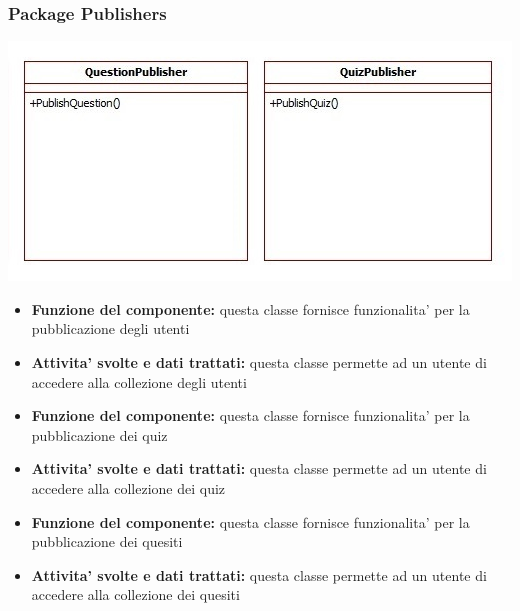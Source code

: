 			\subsubsection{Package Publishers}
			\begin{center}
				\includegraphics[scale=0.6]{../images/Publishers.jpg}
			\end{center}
			\begin{itemize}
				\item\textbf{Funzione del componente:} questa classe fornisce funzionalita' per la pubblicazione degli utenti
				\item\textbf{Attivita' svolte e dati trattati:} questa classe permette ad un utente di accedere alla collezione degli utenti
			\end{itemize}
			\begin{itemize}
				\item\textbf{Funzione del componente:} questa classe fornisce funzionalita' per la pubblicazione dei quiz
				\item\textbf{Attivita' svolte e dati trattati:} questa classe permette ad un utente di accedere alla collezione dei quiz
			\end{itemize}
			\begin{itemize}
				\item\textbf{Funzione del componente:} questa classe fornisce funzionalita' per la pubblicazione dei quesiti
				\item\textbf{Attivita' svolte e dati trattati:} questa classe permette ad un utente di accedere alla collezione dei quesiti
			\end{itemize}